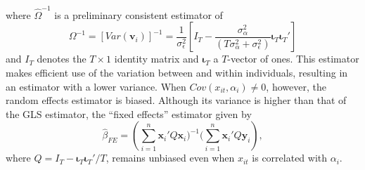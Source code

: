 where $\widehat{\Omega}^{-1}$ is a preliminary consistent estimator of 
\begin{equation}
  \Omega^{-1} = [Var(\mathbf{v}_i)]^{-1} = \frac{1}{\sigma_\epsilon^2} \left[I_T - \frac{\sigma_\alpha^2}{(T\sigma_\alpha^2 + \sigma_\epsilon^2)} \boldsymbol{\iota}_T\boldsymbol{\iota}_T'\right]
  \label{eq:OmegaInvRE}
\end{equation}
and $I_T$ denotes the $T\times 1$ identity matrix and $\boldsymbol{\iota}_T$ a $T$-vector of ones.
This estimator makes efficient use of the variation between and within individuals, resulting in an estimator with a lower variance.
When $Cov(x_{it},\alpha_i)\neq 0$, however, the random effects estimator is biased. 
Although its variance is higher than that of the GLS estimator, the ``fixed effects'' estimator given by 
\begin{equation}
  \widehat{\beta}_{FE} = \left(\sum_{i=1}^{n} \mathbf{x}_i' Q \mathbf{x}_i\bigg)^{-1}\bigg(\sum_{i=1}^{n} \mathbf{x}_i' Q\mathbf{y}_i   \right),
  \label{eq:FEdef}
\end{equation}
where $Q=I_T - \boldsymbol{\iota}_T\boldsymbol{\iota}_T'/T$, remains unbiased even when $x_{it}$ is correlated with $\alpha_i$. 

